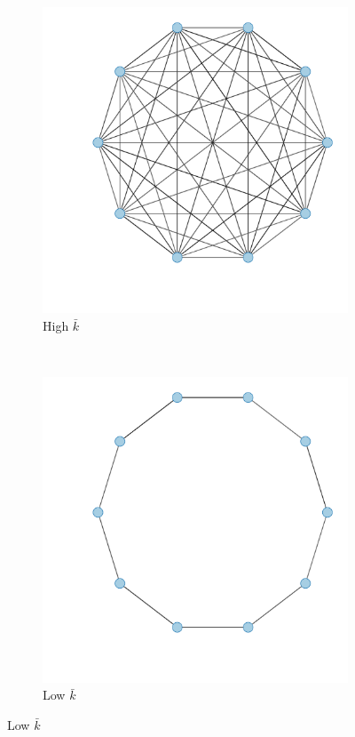 \begin{figure}[t]
\centering
        \begin{subfigure}[b]{0.35\textwidth}
                \centering
		\includegraphics[width=1\textwidth]{imgs/fullyConnected.pdf}
                \caption{High $\bar{k}$}
                \label{fig:fullyConnected}
        \end{subfigure}
        ~ 
	\begin{subfigure}[b]{0.35\textwidth}
                \centering
		\includegraphics[width=1\textwidth]{imgs/minimallyConnected.pdf}
                \caption{Low $\bar{k}$}
                \label{fig:minimallyConnected}
        \end{subfigure}%


\end{figure}

